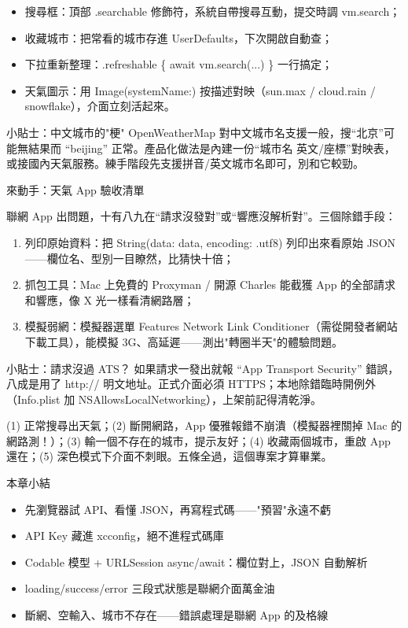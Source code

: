 
\begin{itemize}
  \item 搜尋框：頂部 .searchable 修飾符，系統自帶搜尋互動，提交時調 vm.search；
  \item 收藏城市：把常看的城市存進 UserDefaults，下次開啟自動查；
  \item 下拉重新整理：.refreshable \{ await vm.search(...) \} 一行搞定；
  \item 天氣圖示：用 Image(systemName:) 按描述對映（sun.max / cloud.rain / snowflake），介面立刻活起來。
\end{itemize}

\begin{tcbinfo}{小貼士：中文城市的"梗"}
OpenWeatherMap 對中文城市名支援一般，搜“北京”可能無結果而 “beijing” 正常。產品化做法是內建一份“城市名 英文/座標”對映表，或接國內天氣服務。練手階段先支援拼音/英文城市名即可，別和它較勁。

\end{tcbinfo}

\begin{tcbpractice}{來動手：天氣 App 驗收清單}

聯網 App 出問題，十有八九在“請求沒發對”或“響應沒解析對”。三個除錯手段：

\begin{enumerate}
  \item 列印原始資料：把 String(data: data, encoding: .utf8) 列印出來看原始 JSON——欄位名、型別一目瞭然，比猜快十倍；
  \item 抓包工具：Mac 上免費的 Proxyman / 開源 Charles 能截獲 App 的全部請求和響應，像 X 光一樣看清網路層；
  \item 模擬弱網：模擬器選單 Features Network Link Conditioner（需從開發者網站下載工具），能模擬 3G、高延遲——測出"轉圈半天"的體驗問題。
\end{enumerate}

\begin{tcbinfo}{小貼士：請求沒過 ATS？}
如果請求一發出就報 “App Transport Security” 錯誤，八成是用了 http:// 明文地址。正式介面必須 HTTPS；本地除錯臨時開例外（Info.plist 加 NSAllowsLocalNetworking），上架前記得清乾淨。

\end{tcbinfo}

(1) 正常搜尋出天氣；(2) 斷開網路，App 優雅報錯不崩潰（模擬器裡關掉 Mac 的網路測！）；(3) 輸一個不存在的城市，提示友好；(4) 收藏兩個城市，重啟 App 還在；(5) 深色模式下介面不刺眼。五條全過，這個專案才算畢業。

\end{tcbpractice}

\begin{tcbsummary}{本章小結}
\begin{itemize}
  \item 先瀏覽器試 API、看懂 JSON，再寫程式碼——"預習"永遠不虧
  \item API Key 藏進 xcconfig，絕不進程式碼庫
  \item Codable 模型 + URLSession async/await：欄位對上，JSON 自動解析
  \item loading/success/error 三段式狀態是聯網介面萬金油
  \item 斷網、空輸入、城市不存在——錯誤處理是聯網 App 的及格線
\end{itemize}

\end{tcbsummary}
